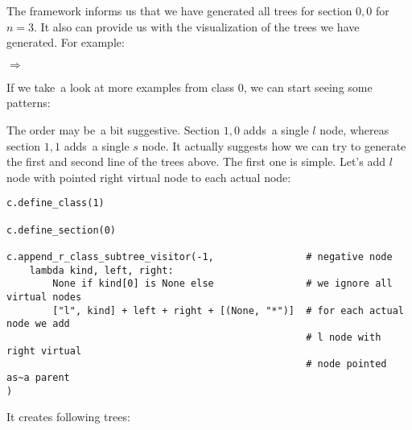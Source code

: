 \documentclass[final]{article}
\theoremstyle{definition}
\theoremstyle{definition}
\theoremstyle{remark}
\newcommand{\includeinlinesvg}[2]{\begin{minipage}{#1\textwidth}\end{minipage}}
\begin{document}
The framework informs us that we have generated all trees for section \(0,0\) for \(n = 3\). It also can provide us with the visualization of the trees we have generated. For example:

\includeinlinesvg{.19}{lambda__trees_00__4_base}%
\(\Rightarrow\)
\includeinlinesvg{.19}{lambda__trees_00__4}%
\includeinlinesvg{.19}{lambda__trees_00__5}%
\includeinlinesvg{.19}{lambda__trees_00__6}%
\includeinlinesvg{.19}{lambda__trees_00__7}%

If we take~a look at more examples from class \(0\), we can start seeing some patterns:

\includeinlinesvg{.33}{lambda__trees_00__2}%
\includeinlinesvg{.33}{lambda__trees_00__3}%
\includeinlinesvg{.33}{lambda__trees_00__7}%

\includeinlinesvg{.33}{lambda__trees_00__4}%
\includeinlinesvg{.33}{lambda__trees_00__12}%
\includeinlinesvg{.33}{lambda__trees_00__13}%

\includeinlinesvg{.16}{lambda__trees_00__0}%
\includeinlinesvg{.16}{lambda__trees_00__1}%
\includeinlinesvg{.16}{lambda__trees_00__5}%
\includeinlinesvg{.16}{lambda__trees_00__6}%
\includeinlinesvg{.16}{lambda__trees_00__14}%
\includeinlinesvg{.16}{lambda__trees_00__15}%

\includeinlinesvg{.25}{lambda__trees_00__8}%
\includeinlinesvg{.25}{lambda__trees_00__9}%
\includeinlinesvg{.25}{lambda__trees_00__10}%
\includeinlinesvg{.25}{lambda__trees_00__11}%

The order may be~a bit suggestive. Section \(1,0\) adds~a single \(l\) node, whereas section \(1,1\) adds~a single \(s\) node. It actually suggests how we can try to generate the first and second line of the trees above. The first one is simple. Let's add \(l\) node with pointed right virtual node to each actual node:

\begin{lstlisting}
c.define_class(1)

c.define_section(0)

c.append_r_class_subtree_visitor(-1,                # negative node
    lambda kind, left, right:
        None if kind[0] is None else                # we ignore all virtual nodes
        ["l", kind] + left + right + [(None, "*")]  # for each actual node we add
                                                    # l node with right virtual
                                                    # node pointed as~a parent
)
\end{lstlisting}

It creates following trees:
\end{document}
